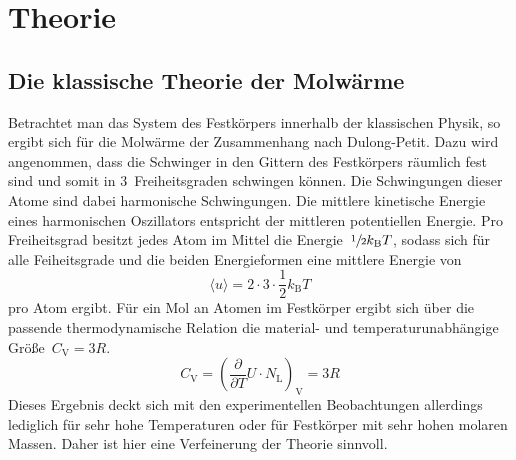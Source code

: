 \section{Theorie}
\label{sec:theorie}
%
\subsection{Die klassische Theorie der Molwärme}
%
Betrachtet man das System des Festkörpers innerhalb der klassischen Physik, so
ergibt sich für die Molwärme der Zusammenhang nach Dulong-Petit. Dazu wird
angenommen, dass die Schwinger in den Gittern des Festkörpers räumlich fest sind
und somit in \num{3}~Freiheitsgraden schwingen können. Die Schwingungen dieser
Atome sind dabei harmonische Schwingungen. Die mittlere kinetische Energie eines
harmonischen Oszillators entspricht der mittleren potentiellen Energie. Pro
Freiheitsgrad besitzt jedes Atom im Mittel die
Energie~$\sfrac{1}{2}k_{\mathrm{B}}T$, sodass sich für alle Feiheitsgrade und
die beiden Energieformen eine mittlere Energie von
%
\begin{equation}
  \langle u\rangle=2\cdot 3\cdot\frac{1}{2}k_{\mathrm{B}}T
\end{equation}
%
pro Atom ergibt. Für ein Mol an Atomen im Festkörper ergibt sich über die
passende thermodynamische Relation die material- und temperaturunabhängige Größe~$C_{\mathrm{V}}=3R$.
%
\begin{equation}
  C_{\mathrm{V}}=\left(\frac{\partial}{\partial T}U\cdot N_{\mathrm{L}}\right)_{\mathrm{V}}=3R
  \label{eq:CV}
\end{equation}
%
Dieses Ergebnis deckt sich mit den experimentellen Beobachtungen allerdings
lediglich für sehr hohe Temperaturen oder für Festkörper mit sehr hohen molaren
Massen. Daher ist hier eine Verfeinerung der Theorie sinnvoll.
%

